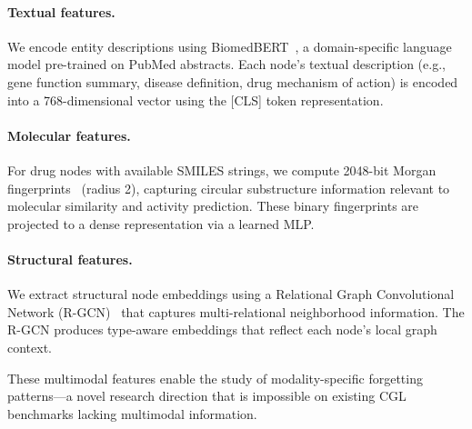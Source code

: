 \paragraph{Textual features.}
We encode entity descriptions using BiomedBERT~\citep{Gu2021}, a domain-specific language model pre-trained on PubMed abstracts.
Each node's textual description (e.g., gene function summary, disease definition, drug mechanism of action) is encoded into a 768-dimensional vector using the [CLS] token representation.

\paragraph{Molecular features.}
For drug nodes with available SMILES strings, we compute 2048-bit Morgan fingerprints~\citep{Rogers2004} (radius 2), capturing circular substructure information relevant to molecular similarity and activity prediction.
These binary fingerprints are projected to a dense representation via a learned MLP.

\paragraph{Structural features.}
We extract structural node embeddings using a Relational Graph Convolutional Network (R-GCN)~\citep{Schlichtkrull2018} that captures multi-relational neighborhood information.
The R-GCN produces type-aware embeddings that reflect each node's local graph context.

These multimodal features enable the study of modality-specific forgetting patterns---a novel research direction that is impossible on existing CGL benchmarks lacking multimodal information.
